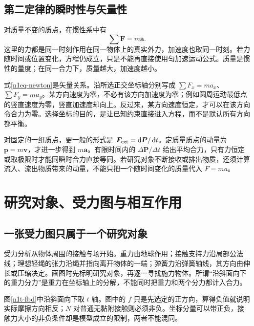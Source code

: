 \subsection{第二定律的瞬时性与矢量性}
对质量不变的质点，在惯性系中有
\begin{equation}\label{n1eq-newton}
\sum\bm F=m\bm a.
\end{equation}
这里的力都是同一时刻作用在同一物体上的真实外力，加速度也取同一时刻。若力随时间或位置变化，方程仍成立，只是不能再直接使用匀加速运动公式。质量是惯性的量度；在同一合力下，质量越大，加速度越小。

式\eqref{n1eq-newton}是矢量关系。沿所选正交坐标轴分别写成 $\sum F_x=ma_x$、$\sum F_y=ma_y$。某方向速度为零，不必有该方向加速度为零；例如圆周运动最低点的竖直速度为零，竖直加速度却向上。反过来，某方向速度恒定，才可以在该方向令合力为零。选择坐标的目的，是让已知约束直接进入方程，而不是默认所有方向都平衡。

对固定的一组质点，更一般的形式是 $\bm F_{\rm ext}=\mathop{}\!\mathrm d\bm P/\mathop{}\!\mathrm d t$。定质量质点的动量为 $\bm p=m\bm v$，才进一步得到 $m\bm a$。有限时间内的 $\Delta\bm P/\Delta t$ 给出平均合力，只有力恒定或取极限时才能同瞬时合力直接等同。若研究对象不断接收或排出物质，还须计算流入、流出物质带来的动量，不能只把一个随时间变化的质量代入 $F=ma$。

\section{研究对象、受力图与相互作用}
\subsection{一张受力图只属于一个研究对象}
受力分析从物体周围的接触与场开始。重力由地球作用；接触支持力沿局部公法线；理想轻绳的张力沿绳并指向离开物体的一端；弹簧力沿弹簧轴线，其方向由伸长或压缩决定。画图时先标明研究对象，再逐一寻找施力物体。所谓“沿斜面向下的重力分力”是重力在坐标轴上的分解，不能同时把重力和两个分力都计入合力。

图\ref{n1t-fbd}中沿斜面向下取 $t$ 轴。图中的 $f$ 只是先选定的正方向，算得负值就说明实际摩擦方向相反；$N$ 对普通无黏附接触则必须非负。坐标分量可以带正负，接触力大小的非负条件却是模型成立的限制，两者不能混同。

